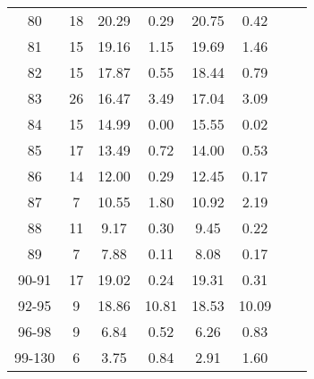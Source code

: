 \begin{center}
\begin{table}[H]
\begin{tabular}{cccccccc}
80 & \num{   18} & \num{20.29} & \num{0.29} & \num{20.75} & \num{0.42} \\
81 & \num{   15} & \num{19.16} & \num{1.15} & \num{19.69} & \num{1.46} \\
82 & \num{   15} & \num{17.87} & \num{0.55} & \num{18.44} & \num{0.79} \\
83 & \num{   26} & \num{16.47} & \num{3.49} & \num{17.04} & \num{3.09} \\
84 & \num{   15} & \num{14.99} & \num{0.00} & \num{15.55} & \num{0.02} \\
85 & \num{   17} & \num{13.49} & \num{0.72} & \num{14.00} & \num{0.53} \\
86 & \num{   14} & \num{12.00} & \num{0.29} & \num{12.45} & \num{0.17} \\
87 & \num{    7} & \num{10.55} & \num{1.80} & \num{10.92} & \num{2.19} \\
88 & \num{   11} & \num{9.17} & \num{0.30} & \num{9.45} & \num{0.22} \\
89 & \num{    7} & \num{7.88} & \num{0.11} & \num{8.08} & \num{0.17} \\
90-91 & \num{   17} & \num{19.02} & \num{0.24} & \num{19.31} & \num{0.31} \\
92-95 & \num{    9} & \num{18.86} & \num{10.81} & \num{18.53} & \num{10.09} \\
96-98 & \num{    9} & \num{6.84} & \num{0.52} & \num{6.26} & \num{0.83} \\
99-130 & \num{    6} & \num{3.75} & \num{0.84} & \num{2.91} & \num{1.60} \\
\bottomrule
\end{tabular}
\end{table}
\end{center}
